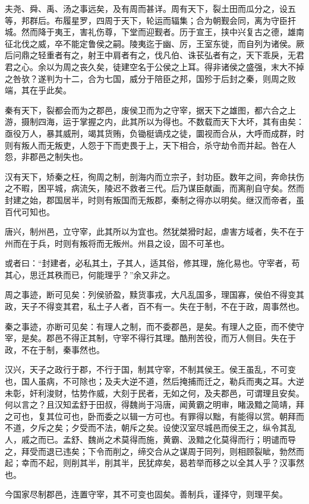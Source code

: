 \documentclass[UTF8,titlepage,oneside]{ctexbook}
\begin{document}
夫尧、舜、禹、汤之事远矣，及有周而甚详。周有天下，裂土田而瓜分之，设五等，邦群后。布履星罗，四周于天下，轮运而辐集；合为朝觐会同，离为守臣扞城。然而降于夷王，害礼伤尊，下堂而迎觐者。历于宣王，挟中兴复古之德，雄南征北伐之威，卒不能定鲁侯之嗣。陵夷迄于幽、厉，王室东徙，而自列为诸侯。厥后问鼎之轻重者有之，射王中肩者有之，伐凡伯、诛苌弘者有之，天下乖戾，无君君之心。余以为周之丧久矣，徒建空名于公侯之上耳。得非诸侯之盛强，末大不掉之咎欤？遂判为十二，合为七国，威分于陪臣之邦，国殄于后封之秦，则周之败端，其在乎此矣。


秦有天下，裂都会而为之郡邑，废侯卫而为之守宰，据天下之雄图，都六合之上游，摄制四海，运于掌握之内，此其所以为得也。不数载而天下大坏，其有由矣：亟役万人，暴其威刑，竭其货贿，负锄梃谪戍之徒，圜视而合从，大呼而成群，时则有叛人而无叛吏，人怨于下而吏畏于上，天下相合，杀守劫令而并起。咎在人怨，非郡邑之制失也。


汉有天下，矫秦之枉，徇周之制，剖海内而立宗子，封功臣。数年之间，奔命扶伤之不暇，困平城，病流矢，陵迟不救者三代。后乃谋臣献画，而离削自守矣。然而封建之始，郡国居半，时则有叛国而无叛郡，秦制之得亦以明矣。继汉而帝者，虽百代可知也。


唐兴，制州邑，立守宰，此其所以为宜也。然犹桀猾时起，虐害方域者，失不在于州而在于兵，时则有叛将而无叛州。州县之设，固不可革也。


或者曰：“封建者，必私其土，子其人，适其俗，修其理，施化易也。守宰者，苟其心，思迁其秩而已，何能理乎？”余又非之。


周之事迹，断可见矣：列侯骄盈，黩货事戎，大凡乱国多，理国寡，侯伯不得变其政，天子不得变其君，私土子人者，百不有一。失在于制，不在于政，周事然也。


秦之事迹，亦断可见矣：有理人之制，而不委郡邑，是矣。有理人之臣，而不使守宰，是矣。郡邑不得正其制，守宰不得行其理。酷刑苦役，而万人侧目。失在于政，不在于制，秦事然也。


汉兴，天子之政行于郡，不行于国，制其守宰，不制其侯王。侯王虽乱，不可变也，国人虽病，不可除也；及夫大逆不道，然后掩捕而迁之，勒兵而夷之耳。大逆未彰，奸利浚财，怙势作威，大刻于民者，无如之何，及夫郡邑，可谓理且安矣。何以言之？且汉知孟舒于田叔，得魏尚于冯唐，闻黄霸之明审，睹汲黯之简靖，拜之可也，复其位可也，卧而委之以辑一方可也。有罪得以黜，有能得以赏。朝拜而不道，夕斥之矣；夕受而不法，朝斥之矣。设使汉室尽城邑而侯王之，纵令其乱人，戚之而已。孟舒、魏尚之术莫得而施，黄霸、汲黯之化莫得而行；明谴而导之，拜受而退已违矣；下令而削之，缔交合从之谋周于同列，则相顾裂眦，勃然而起；幸而不起，则削其半，削其半，民犹瘁矣，曷若举而移之以全其人乎？汉事然也。


今国家尽制郡邑，连置守宰，其不可变也固矣。善制兵，谨择守，则理平矣。
\end{document}
